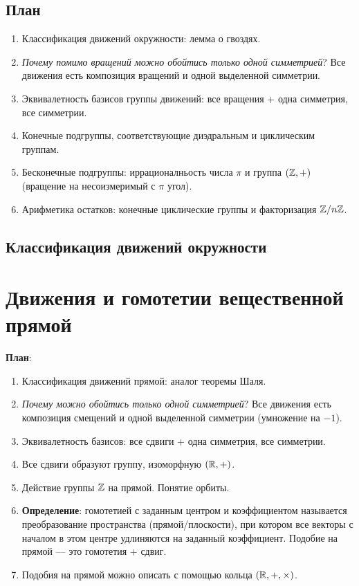 \subsection{План}
\begin{enumerate}
\item Классификация движений окружности: лемма о гвоздях.
\item \textit{Почему помимо вращений можно обойтись только одной симметрией}? Все движения есть композиция вращений и одной выделенной симметрии.
\item Эквивалетность базисов группы движений: все вращения + одна симметрия, все симметрии.
\item Конечные подгруппы, соответствующие диэдральным и циклическим группам.
\item Бесконечные подгруппы: иррационалньость числа $\pi$ и группа $(\mathbb Z,+)$ (вращение на несоизмеримый с $\pi$ угол).
\item Арифметика остатков: конечные циклические группы и факторизация $\mathbb Z/n\mathbb Z$.
\end{enumerate}


\subsection{Классификация движений окружности}







\section{Движения и гомотетии вещественной прямой}



\textbf{План}:
\begin{enumerate}
\item Классификация движений прямой: аналог теоремы Шаля.
\item \textit{Почему можно обойтись только одной симметрией}? Все движения есть композиция смещений и одной выделенной симметрии (умножение на $-1$).
\item Эквивалетность базисов: все сдвиги + одна симметрия, все симметрии.
\item Все сдвиги образуют группу, изоморфную $(\mathbb R,+)$.
\item Действие группы $\mathbb Z$ на прямой. Понятие орбиты.
\item \textbf{Определение}: гомотетией с заданным центром и коэффициентом называется преобразование пространства (прямой/плоскости), при котором все векторы с началом в этом центре удлиняются на заданный коэффициент. Подобие на прямой --- это гомотетия + сдвиг.
\item Подобия на прямой можно описать с помощью кольца $(\mathbb R,+,\times)$.
\end{enumerate}







